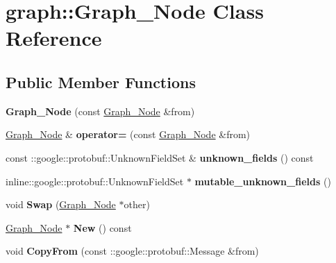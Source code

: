 \hypertarget{classgraph_1_1Graph__Node}{
\section{graph::Graph\_\-Node Class Reference}
\label{classgraph_1_1Graph__Node}
}
\subsection*{Public Member Functions}
\begin{DoxyCompactItemize}
\item 
\hypertarget{classgraph_1_1Graph__Node_a3e14dbbb1960cdceb42a22f191851a6b}{
{\bfseries Graph\_\-Node} (const \hyperlink{classgraph_1_1Graph__Node}{Graph\_\-Node} \&from)}
\label{classgraph_1_1Graph__Node_a3e14dbbb1960cdceb42a22f191851a6b}

\item 
\hypertarget{classgraph_1_1Graph__Node_a1b117f5f955e29ec6e990e50cc2026e0}{
\hyperlink{classgraph_1_1Graph__Node}{Graph\_\-Node} \& {\bfseries operator=} (const \hyperlink{classgraph_1_1Graph__Node}{Graph\_\-Node} \&from)}
\label{classgraph_1_1Graph__Node_a1b117f5f955e29ec6e990e50cc2026e0}

\item 
\hypertarget{classgraph_1_1Graph__Node_a1292a0d7a11d6709ee0a3bffd699ddc6}{
const ::google::protobuf::UnknownFieldSet \& {\bfseries unknown\_\-fields} () const }
\label{classgraph_1_1Graph__Node_a1292a0d7a11d6709ee0a3bffd699ddc6}

\item 
\hypertarget{classgraph_1_1Graph__Node_a458590dbf61732e966b050e46a5b9ee0}{
inline::google::protobuf::UnknownFieldSet $\ast$ {\bfseries mutable\_\-unknown\_\-fields} ()}
\label{classgraph_1_1Graph__Node_a458590dbf61732e966b050e46a5b9ee0}

\item 
\hypertarget{classgraph_1_1Graph__Node_a7161b02ad669bb3c0eba53b5231467d9}{
void {\bfseries Swap} (\hyperlink{classgraph_1_1Graph__Node}{Graph\_\-Node} $\ast$other)}
\label{classgraph_1_1Graph__Node_a7161b02ad669bb3c0eba53b5231467d9}

\item 
\hypertarget{classgraph_1_1Graph__Node_a29347d8834678e64e08cddccc5c0a3dc}{
\hyperlink{classgraph_1_1Graph__Node}{Graph\_\-Node} $\ast$ {\bfseries New} () const }
\label{classgraph_1_1Graph__Node_a29347d8834678e64e08cddccc5c0a3dc}

\item 
\hypertarget{classgraph_1_1Graph__Node_a5f3eca853b1a6ab6d72b95fc63edc476}{
void {\bfseries CopyFrom} (const ::google::protobuf::Message \&from)}
\label{classgraph_1_1Graph__Node_a5f3eca853b1a6ab6d72b95fc63edc476}


\end{DoxyCompactItemize}
